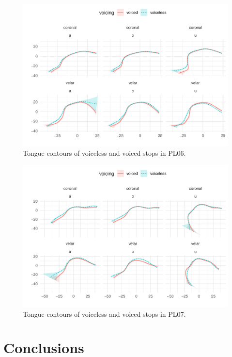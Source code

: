 \documentclass[11pt,]{article}
\begin{document}
\begin{figure}

{\centering \includegraphics[width=.8\textwidth]{2018-polar-gam_files/figure-latex/Figure17} 

}

\caption{Tongue contours of voiceless and voiced stops in PL06.}\label{f:Figure17}
\end{figure}

\begin{figure}

{\centering \includegraphics[width=.8\textwidth]{2018-polar-gam_files/figure-latex/Figure18} 

}

\caption{Tongue contours of voiceless and voiced stops in PL07.}\label{f:Figure18}
\end{figure}

\hypertarget{conclusions}{%
\section{Conclusions}\label{conclusions}}
\end{document}
